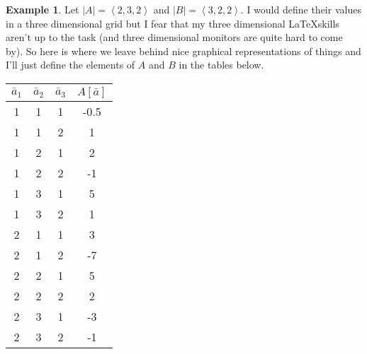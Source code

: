 \documentclass[12pt]{book}
\theoremstyle{plain}
\theoremstyle{definition}
\newtheorem{example}{Example}[chapter]
\theoremstyle{ppart}
\theoremstyle{case}
\theoremstyle{solution}
\begin{document}
\newpage
\begin{example}
Let $|A| = \left<2, 3, 2\right>$ and $|B| = \left<3, 2, 2\right>$. I would
define their values in a three dimensional grid but I fear that my three dimensional
\LaTeX skills aren't up to the task (and three dimensional monitors are quite hard to
come by). So here is where we leave behind nice graphical representations of
things and I'll just define the elements of $A$ and $B$ in the tables below.
\begin{table}[h!]
\begin{center}
\begin{tabular}{c c c | c}
$\bar{a}_1$ & $\bar{a}_2$ & $\bar{a}_3$ & $A[\bar{a}]$ \\
\hline
1           & 1           & 1           & -0.5         \\
1           & 1           & 2           & 1            \\
1           & 2           & 1           & 2            \\
1           & 2           & 2           & -1           \\
1           & 3           & 1           & 5            \\
1           & 3           & 2           & 1            \\
2           & 1           & 1           & 3            \\
2           & 1           & 2           & -7           \\
2           & 2           & 1           & 5            \\
2           & 2           & 2           & 2            \\
2           & 3           & 1           & -3           \\
2           & 3           & 2           & -1
\end{tabular}
\end{center}
\end{table}


\end{example}
\end{document}
